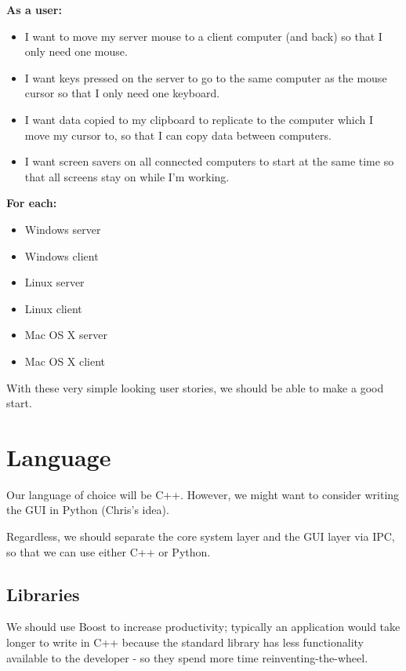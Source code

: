 \documentclass{article}
\begin{document}
\textbf{As a user:}

\begin{itemize}
  \item I want to move my server mouse to a client computer (and back) so that 
    I only need one mouse.
  \item I want keys pressed on the server to go to the same computer as the
    mouse cursor so that I only need one keyboard.
  \item I want data copied to my clipboard to replicate to the computer which
    I move my cursor to, so that I can copy data between computers.
  \item I want screen savers on all connected computers to start at the same time
    so that all screens stay on while I'm working.
\end{itemize}

\textbf{For each:}

\begin{itemize}
  \item Windows server
  \item Windows client
  \item Linux server
  \item Linux client
  \item Mac OS X server
  \item Mac OS X client
\end{itemize}

With these very simple looking user stories, we should be able to make a good 
start.

\section{Language}

Our language of choice will be C++. However, we might want to consider writing
the GUI in Python (Chris's idea).

Regardless, we should separate the core system layer and the GUI layer via IPC,
so that we can use either C++ or Python.

\subsection{Libraries}

We should use Boost to increase productivity; typically an application would
take longer to write in C++ because the standard library has less functionality
available to the developer - so they spend more time reinventing-the-wheel.
\end{document}
